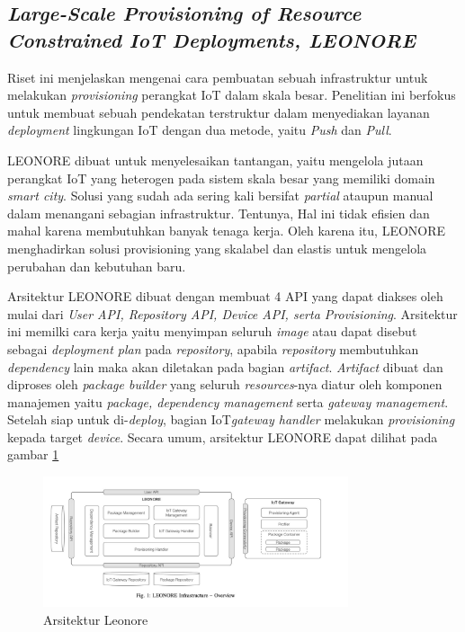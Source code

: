 \subsection{\textit{Large-Scale Provisioning of
    Resource Constrained
    IoT Deployments, LEONORE}}
\label{subsec:leonore}

Riset ini menjelaskan mengenai cara pembuatan sebuah infrastruktur untuk melakukan \textit{provisioning} perangkat IoT dalam skala besar. Penelitian ini berfokus untuk membuat sebuah pendekatan terstruktur dalam menyediakan layanan \textit{deployment} lingkungan IoT dengan dua metode, yaitu \textit{Push} dan \textit{Pull}.

LEONORE dibuat untuk menyelesaikan tantangan, yaitu mengelola jutaan perangkat IoT yang heterogen pada sistem skala besar yang memiliki domain \textit{smart city}. Solusi yang sudah ada sering kali bersifat \textit{partial} ataupun manual dalam menangani sebagian infrastruktur. Tentunya, Hal ini tidak efisien dan mahal karena membutuhkan banyak tenaga kerja. Oleh karena itu, LEONORE menghadirkan solusi provisioning yang skalabel dan elastis untuk mengelola perubahan dan kebutuhan baru.

Arsitektur LEONORE dibuat dengan membuat 4 API yang dapat diakses oleh mulai dari  \textit{User API, Repository API, Device API, serta Provisioning}. Arsitektur ini memilki cara kerja yaitu menyimpan seluruh \textit{image} atau dapat disebut sebagai \textit{deployment plan} pada \textit{repository}, apabila \textit{repository} membutuhkan \textit{dependency} lain maka akan diletakan pada bagian \textit{artifact}. \textit{Artifact} dibuat dan diproses oleh \textit{package builder} yang seluruh \textit{resources}-nya diatur oleh komponen manajemen yaitu \textit{package, dependency management} serta \textit{gateway management}. Setelah siap untuk di-\textit{deploy}, bagian IoT\textit{gateway handler} melakukan \textit{provisioning} kepada target \textit{device}. Secara umum, arsitektur LEONORE dapat dilihat pada gambar \ref{fig:arsitektur-leonore}

\begin{figure}[ht]
  \centering
  \includegraphics[width=0.8\textwidth]{resources/chapter-2/arsitektur-leonore.jpg}
  \caption{Arsitektur Leonore \parencite{vogler2015leonore}}
  \label{fig:arsitektur-leonore}
\end{figure}

